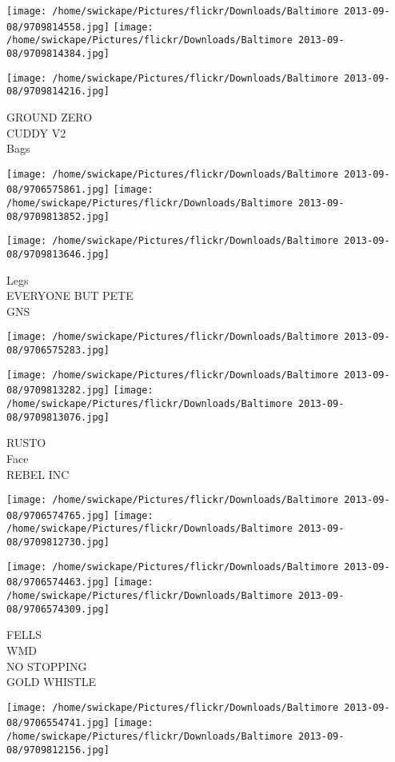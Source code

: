 \documentclass[10pt,letterpaper]{article}
\begin{document}
\texttt{[image: /home/swickape/Pictures/flickr/Downloads/Baltimore 2013-09-08/9709814558.jpg]}
\texttt{[image: /home/swickape/Pictures/flickr/Downloads/Baltimore 2013-09-08/9709814384.jpg]}

\vspace{0.25in}
\texttt{[image: /home/swickape/Pictures/flickr/Downloads/Baltimore 2013-09-08/9709814216.jpg]}

GROUND ZERO\\
CUDDY V2\\
Bags
\pagebreak

\texttt{[image: /home/swickape/Pictures/flickr/Downloads/Baltimore 2013-09-08/9706575861.jpg]}
\texttt{[image: /home/swickape/Pictures/flickr/Downloads/Baltimore 2013-09-08/9709813852.jpg]}

\texttt{[image: /home/swickape/Pictures/flickr/Downloads/Baltimore 2013-09-08/9709813646.jpg]}

Legs\\
EVERYONE BUT PETE\\
GNS
\pagebreak

\texttt{[image: /home/swickape/Pictures/flickr/Downloads/Baltimore 2013-09-08/9706575283.jpg]}

\vspace{0.25in}
\texttt{[image: /home/swickape/Pictures/flickr/Downloads/Baltimore 2013-09-08/9709813282.jpg]}
\texttt{[image: /home/swickape/Pictures/flickr/Downloads/Baltimore 2013-09-08/9709813076.jpg]}

RUSTO\\
Face\\
REBEL INC
\pagebreak

\texttt{[image: /home/swickape/Pictures/flickr/Downloads/Baltimore 2013-09-08/9706574765.jpg]}
\texttt{[image: /home/swickape/Pictures/flickr/Downloads/Baltimore 2013-09-08/9709812730.jpg]}

\texttt{[image: /home/swickape/Pictures/flickr/Downloads/Baltimore 2013-09-08/9706574463.jpg]}
\texttt{[image: /home/swickape/Pictures/flickr/Downloads/Baltimore 2013-09-08/9706574309.jpg]}

FELLS\\
WMD\\
NO STOPPING\\
GOLD WHISTLE
\pagebreak

\texttt{[image: /home/swickape/Pictures/flickr/Downloads/Baltimore 2013-09-08/9706554741.jpg]}
\texttt{[image: /home/swickape/Pictures/flickr/Downloads/Baltimore 2013-09-08/9709812156.jpg]}
\end{document}
